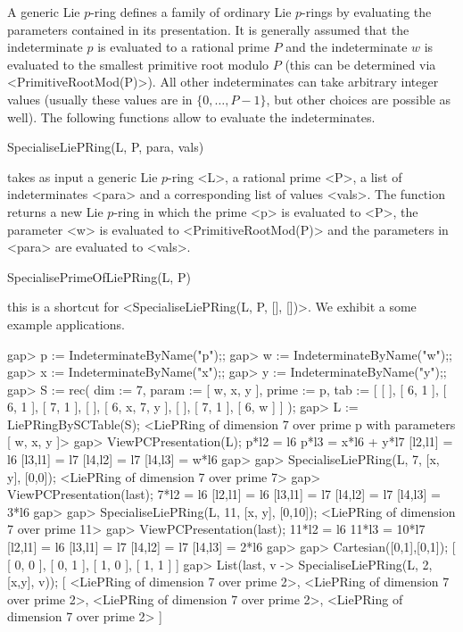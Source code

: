 
A generic Lie $p$-ring defines a family of ordinary Lie $p$-rings by 
evaluating the parameters contained in its presentation. It is generally 
assumed that the indeterminate $p$ is evaluated to a rational prime $P$ 
and the indeterminate $w$ is evaluated to the smallest primitive root 
modulo $P$ (this can be determined via <PrimitiveRootMod(P)>). All other 
indeterminates can take arbitrary integer values (usually these values are
in $\{0, \ldots, P-1\}$, but other choices are possible as well). The 
following functions allow to evaluate the indeterminates.

\> SpecialiseLiePRing(L, P, para, vals)

takes as input a generic Lie $p$-ring <L>, a rational prime <P>, 
a list of indeterminates <para> and a corresponding list of values
<vals>. The function returns a new Lie $p$-ring in which the prime 
<p> is evaluated to <P>, the parameter <w> is evaluated to 
<PrimitiveRootMod(P)> and the parameters in <para> are evaluated
to <vals>. 

\> SpecialisePrimeOfLiePRing(L, P)

this is a shortcut for <SpecialiseLiePRing(L, P, [], [])>. We exhibit
a some example applications.

\beginexample
gap> p := IndeterminateByName("p");;
gap> w := IndeterminateByName("w");;
gap> x := IndeterminateByName("x");;
gap> y := IndeterminateByName("y");;
gap> S := rec( dim := 7, 
               param := [ w, x, y ], 
               prime := p, 
               tab := [ [  ], [ 6, 1 ], [ 6, 1 ], [ 7, 1 ], [  ], 
                        [ 6, x, 7, y ], [  ], [ 7, 1 ], [ 6, w ] ] );
gap> L := LiePRingBySCTable(S);
<LiePRing of dimension 7 over prime p with parameters [ w, x, y ]>
gap> ViewPCPresentation(L);
p*l2 = l6
p*l3 = x*l6 + y*l7
[l2,l1] = l6
[l3,l1] = l7
[l4,l2] = l7
[l4,l3] = w*l6
gap> 
gap> SpecialiseLiePRing(L, 7, [x, y], [0,0]);
<LiePRing of dimension 7 over prime 7>
gap> ViewPCPresentation(last);
7*l2 = l6
[l2,l1] = l6
[l3,l1] = l7
[l4,l2] = l7
[l4,l3] = 3*l6
gap>
gap> SpecialiseLiePRing(L, 11, [x, y], [0,10]);
<LiePRing of dimension 7 over prime 11>
gap> ViewPCPresentation(last);
11*l2 = l6
11*l3 = 10*l7
[l2,l1] = l6
[l3,l1] = l7
[l4,l2] = l7
[l4,l3] = 2*l6
gap>
gap> Cartesian([0,1],[0,1]);
[ [ 0, 0 ], [ 0, 1 ], [ 1, 0 ], [ 1, 1 ] ]
gap> List(last, v -> SpecialiseLiePRing(L, 2, [x,y], v));
[ <LiePRing of dimension 7 over prime 2>, 
  <LiePRing of dimension 7 over prime 2>, 
  <LiePRing of dimension 7 over prime 2>, 
  <LiePRing of dimension 7 over prime 2> ]
\endexample

